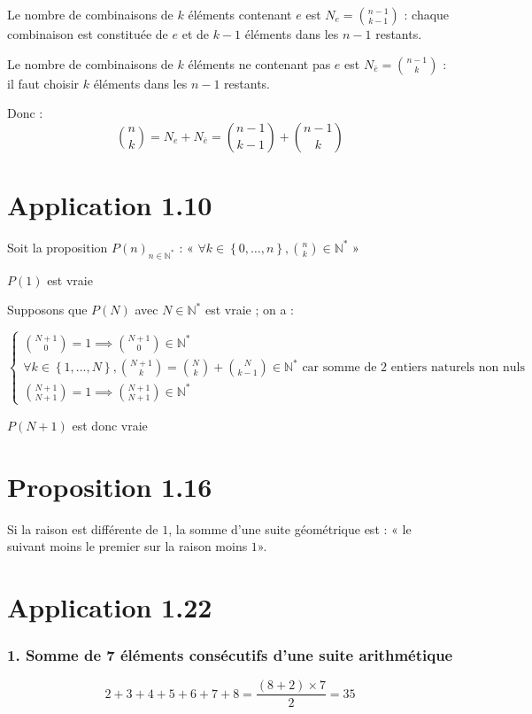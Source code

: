 \documentclass{report}
\begin{document}
Le nombre de combinaisons de $k$ éléments contenant $e$ est $N_e = \binom{n-1}{k-1}$ : chaque combinaison est
constituée de $e$ et de $k-1$ éléments dans les $n-1$ restants.

Le nombre de combinaisons de $k$ éléments ne contenant pas $e$ est $N_{\bar{e}} = \binom{n-1}{k}$ : il faut choisir $k$ éléments dans les $n-1$ restants.

Donc :
\begin{displaymath}
\binom{n}{k}= N_e + N_{\bar{e}} =  \binom{n-1}{k-1}+ \binom{n-1}{k}
\end{displaymath}


\section*{Application 1.10}

Soit la proposition $P(n)_{n \in \mathbb{N}^*}$ : « $\forall  k \in \left\lbrace 0,\ldots, n\right\rbrace, \binom{n}{k} \in \mathbb{N}^*$ »

$P(1)$ est vraie

Supposons que  $P(N)$ avec $N \in \mathbb{N}^*$ est vraie ; on a :

\begin{equation*}
	\begin{cases}
		\binom{N+1}{0} = 1 \implies \binom{N+1}{0} \in \mathbb{N}^* \\
		\forall k \in \left\lbrace 1, ... , N\right\rbrace , \binom{N+1}{k} = \binom{N}{k} + \binom{N}{k-1} \in \mathbb{N}^* \text{ car somme de 2 entiers naturels non nuls}\\
		\binom{N+1}{N+1} = 1  \implies \binom{N+1}{N+1} \in \mathbb{N}^*
	\end{cases}
\end{equation*}

$P(N+1)$ est donc vraie


\section*{Proposition 1.16}

Si la raison est différente de $1$, la somme d'une suite géométrique est : « le suivant moins le premier sur la raison moins $1$».

\section*{Application 1.22}

\subsubsection*{1. Somme de 7 éléments consécutifs d'une suite arithmétique}
\begin{displaymath}
	2 + 3 + 4 + 5 + 6 + 7 + 8 = \frac{(8+2)\times 7}{2} = 35
\end{displaymath}
\end{document}
